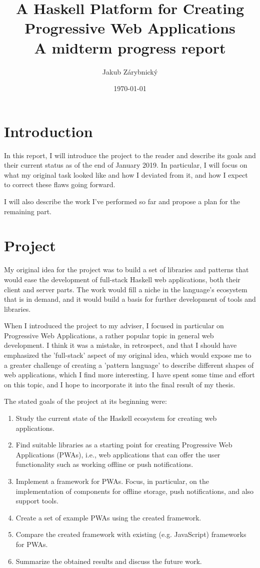 \documentclass[11pt,a4paper]{scrartcl}
\author{Jakub Zárybnický}
\date{\today}
\title{A Haskell Platform for Creating Progressive Web Applications\\\medskip
\large A midterm progress report}
\begin{document}
\maketitle
\tableofcontents


\section{Introduction}
\label{sec:org4022981}
In this report, I will introduce the project to the reader and describe its goals
and their current status as of the end of January 2019. In particular, I will
focus on what my original task looked like and how I deviated from it, and how I
expect to correct these flaws going forward.

I will also describe the work I've performed so far and propose a plan for the
remaining part.

\section{Project}
\label{sec:org440b3be}
My original idea for the project was to build a set of libraries and patterns
that would ease the development of full-stack Haskell web applications, both
their client and server parts. The work would fill a niche in the language's
ecosystem that is in demand, and it would build a basis for further development
of tools and libraries.

When I introduced the project to my adviser, I focused in particular on
Progressive Web Applications, a rather popular topic in general web
development. I think it was a mistake, in retrospect, and that I should have
emphasized the 'full-stack' aspect of my original idea, which would expose me to
a greater challenge of creating a 'pattern language' to describe different
shapes of web applications, which I find more interesting. I have spent some
time and effort on this topic, and I hope to incorporate it into the final
result of my thesis.

The stated goals of the project at its beginning were:

\begin{enumerate}
\item Study the current state of the Haskell ecosystem for creating web
applications.
\item Find suitable libraries as a starting point for creating Progressive Web
Applications (PWAs), i.e., web applications that can offer the user
functionality such as working offline or push notifications.
\item Implement a framework for PWAs. Focus, in particular, on the implementation
of components for offline storage, push notifications, and also support
tools.
\item Create a set of example PWAs using the created framework.
\item Compare the created framework with existing (e.g. JavaScript) frameworks for
PWAs.
\item Summarize the obtained results and discuss the future work.
\end{enumerate}
\end{document}
